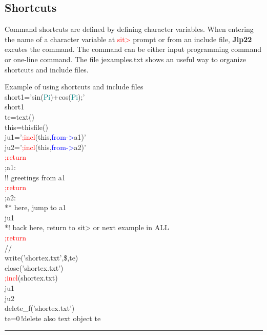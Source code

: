 \subsection{Shortcuts} 
\label{short} 
Command shortcuts are defined by defining character variables. When entering the 
name of a character variable at \textcolor{Red}{sit>} prompt or from an include file, \textbf{Jlp22} excutes the command. 
The command can be either input programming command or one-line command. The file jexamples.txt 
shows an useful way to organize shortcuts and include files. 
\singlespacing 
\begin{example}[shortex]Example of using shortcuts and include files\\ 
\label{shortex} 
\noindent short1='\textcolor{VioletRed}{sin}(\textcolor{teal}{Pi})+\textcolor{VioletRed}{cos}(\textcolor{teal}{Pi});'\\ 
short1\\ 
te=\textcolor{VioletRed}{text}()\\ 
this=\textcolor{VioletRed}{thisfile}()\\ 
ju1='\textcolor{Red}{;incl}(this,\textcolor{blue}{from->}a1)'\\ 
ju2='\textcolor{Red}{;incl}(this,\textcolor{blue}{from->}a2)'\\ 
\textcolor{Red}{;return}\\ 
;a1:\\ 
{\color{ForestGreen}!! greetings from a1}\\ 
\textcolor{Red}{;return}\\ 
;a2:\\ 
{\color{ForestGreen}** here, jump to a1}\\ 
ju1\\ 
{\color{ForestGreen}*! back here, return to sit> or next example in ALL}\\ 
\textcolor{Red}{;return}\\ 
//                      \\ 
\textcolor{VioletRed}{write}('shortex.txt',\$,te)\\ 
\textcolor{VioletRed}{close}('shortex.txt')\\ 
\textcolor{Red}{;incl}(shortex.txt)\\ 
ju1\\ 
ju2\\ 
\textcolor{VioletRed}{delete\_f}('shortex.txt')\\ 
te=0\,{\color{ForestGreen}!delete also text object te}\\ 
\end{example} 
\vspace{-7mm} \rule{5cm}{0.1pt} 
\onehalfspacing 
